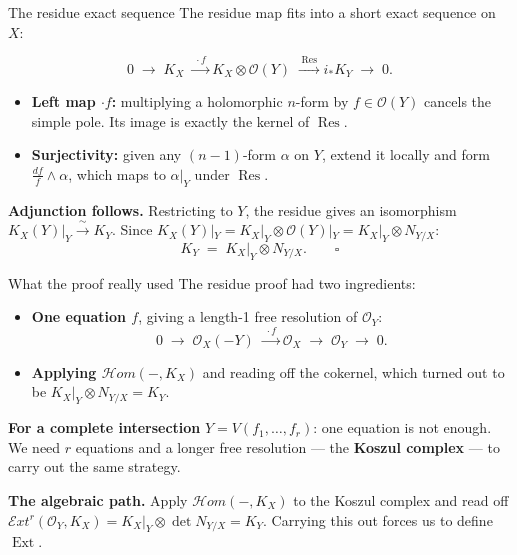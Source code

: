 \documentclass[aspectratio=169,12pt]{beamer}
\newenvironment{mathbox}{%
  \begin{tcolorbox}[mathbox]}{%
  \end{tcolorbox}}
\begin{document}
\begin{frame}{The residue exact sequence}
  The residue map fits into a short exact sequence on $X$:
  \begin{mathbox}
  \[
    0 \;\longrightarrow\; K_X \;\xrightarrow{\;\cdot f\;}
      K_X \otimes \mathcal{O}(Y)
      \;\xrightarrow{\;\operatorname{Res}\;}
      i_* K_Y \;\longrightarrow\; 0.
  \]
  \end{mathbox}

  \begin{itemize}
    \item \textbf{Left map $\cdot f$:} multiplying a holomorphic $n$-form by
          $f \in \mathcal{O}(Y)$ cancels the simple pole.
          Its image is exactly the kernel of $\operatorname{Res}$.
    \item \textbf{Surjectivity:} given any $(n-1)$-form $\alpha$ on $Y$,
          extend it locally and form $\tfrac{df}{f} \wedge \alpha$,
          which maps to $\alpha|_Y$ under $\operatorname{Res}$.
  \end{itemize}

  \medskip

  \textbf{Adjunction follows.}\enspace
  Restricting to $Y$, the residue gives an isomorphism
  $K_X(Y)|_Y \xrightarrow{\;\sim\;} K_Y$.
  Since $K_X(Y)|_Y = K_X|_Y \otimes \mathcal{O}(Y)|_Y = K_X|_Y \otimes N_{Y/X}$:
  \[
    K_Y \;=\; K_X\big|_Y \otimes N_{Y/X}. \qquad \square
  \]
\end{frame}

\begin{frame}{What the proof really used}
  The residue proof had two ingredients:

  \medskip

  \begin{itemize}
    \item \textbf{One equation $f$}, giving a length-1 free resolution of $\mathcal{O}_Y$:
    \[
      0 \;\longrightarrow\; \mathcal{O}_X(-Y) \;\xrightarrow{\;\cdot f\;}
        \mathcal{O}_X \;\longrightarrow\; \mathcal{O}_Y \;\longrightarrow\; 0.
    \]
    \item \textbf{Applying $\mathcal{H}om(-, K_X)$} and reading off the cokernel,
          which turned out to be $K_X|_Y \otimes N_{Y/X} = K_Y$.
  \end{itemize}

  \medskip

  \textbf{For a complete intersection} $Y = V(f_1, \ldots, f_r)$:
  one equation is not enough.
  We need $r$ equations and a longer free resolution —
  the \textbf{Koszul complex} — to carry out the same strategy.

  \medskip

  \textbf{The algebraic path.}
  Apply $\mathcal{H}om(-, K_X)$ to the Koszul complex and read off
  $\mathcal{E}xt^r(\mathcal{O}_Y, K_X) = K_X|_Y \otimes \det N_{Y/X} = K_Y$.
  Carrying this out forces us to define $\operatorname{Ext}$.
\end{frame}
\end{document}

